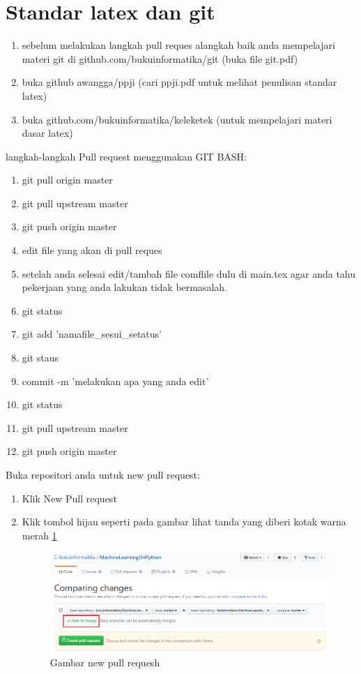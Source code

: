 \section{Standar latex dan git}

\begin{enumerate}
\item sebelum melakukan langkah pull reques alangkah baik anda mempelajari materi git di github.com/bukuinformatika/git (buka file git.pdf)
\item buka github awangga/ppji (cari ppji.pdf untuk melihat penulisan standar latex)
\item buka github.com/bukuinformatika/keleketek (untuk mempelajari materi dasar latex)
\end{enumerate}

 langkah-langkah Pull request menggunakan GIT BASH:
\begin{enumerate}
\item git pull origin master
\item git pull upstream master
\item git push origin master
\item edit file yang akan di pull reques
\item setelah anda selesai edit/tambah file comflile dulu di main.tex agar anda tahu pekerjaan yang anda lakukan tidak bermasalah.
\item git status
\item git add 'namafile\_sesui\_setatus'
\item git staus 
\item commit -m 'melakukan apa yang anda edit'
\item git status
\item git pull upstream master
\item git push origin master
\end{enumerate}

Buka repositori anda untuk new pull request:
\begin{enumerate}
\item Klik New Pull request
\item Klik tombol hijau seperti pada gambar lihat tanda yang diberi kotak warna merah \ref{labelgambar1} 
		\begin{figure}[htbp]
		\centering
		\includegraphics[width=1\textwidth]{figures/1.PNG}
		\caption{Gambar new pull requesh}
		\label{labelgambar1}
		\end{figure}	 
\end{enumerate}